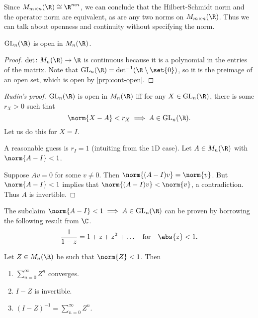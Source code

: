 Since $M_{m \times n}(\R) \cong \R^{mn}$, we can conclude that
the Hilbert-Schmidt norm and the operator norm are equivalent,
as are any two norms on $M_{m \times n}(\R)$.
Thus we can talk about openness and continuity without specifying
the norm.

\begin{proposition}
    $\GL_n(\R)$ is open in $M_n(\R)$.
\end{proposition}
\begin{proof}
    $\det \colon M_n(\R) \to \R$ is continuous because
    it is a polynomial in the entries of the matrix.
    Note that $\GL_n(\R) = \det^{-1}(\R \setminus \set{0})$,
    so it is the preimage of an open set, which is open
    by \cref{prp:cont-open}.
\end{proof}
\begin{proof}[Rudin's proof]
    $\GL_n(\R)$ is open in $M_n(\R)$ iff for any $X \in \GL_n(\R)$,
    there is some $r_X > 0$ such that \[
        \norm{X - A} < r_X \implies A \in \GL_n(\R).
    \]
    Let us do this for $X = I$.

    A reasonable guess is $r_I = 1$ (intuiting from the $1$D case).
    Let $A \in M_n(\R)$ with $\norm{A - I} < 1$.

    Suppose $Av = 0$ for some $v \ne 0$.
    Then $\norm{(A - I)v} = \norm{v}$.
    But $\norm{A - I} < 1$ implies that $\norm{(A - I)v} < \norm{v}$,
    a contradiction.
    Thus $A$ is invertible.
\end{proof}
The subclaim $\norm{A - I} < 1 \implies A \in \GL_n(\R)$
can be proven by borrowing the following result from $\C$. \[
    \frac1{1-z} = 1 + z + z^2 + \ldots \quad \text{for} \quad \abs{z} < 1.
\]
\begin{lemma}
    Let $Z \in M_n(\R)$ be such that $\norm{Z} < 1$.
    Then
    \begin{enumerate}
        \item $\sum_{n=0}^\infty Z^n$ converges.
        \item $I - Z$ is invertible.
        \item $(I - Z)^{-1} = \sum_{n=0}^\infty Z^n$.
    \end{enumerate}
\end{lemma}
